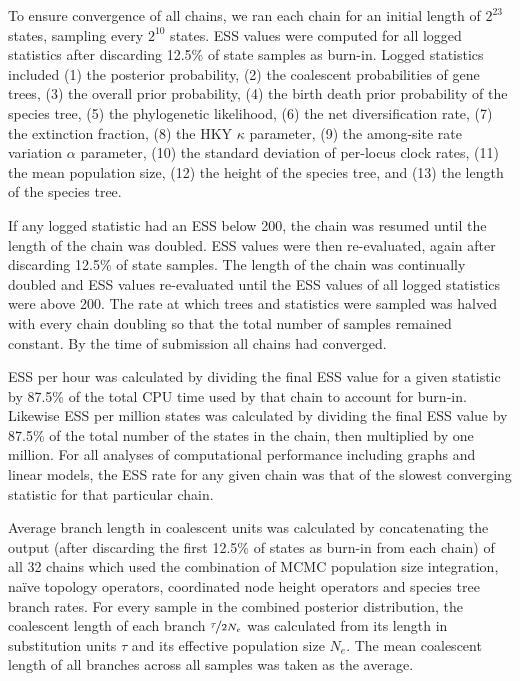 \documentclass[12pt]{article}
\begin{document}
To ensure convergence of all chains, we ran each chain for an initial length of
$2^{23}$ states, sampling every $2^{10}$ states. ESS values were computed for
all logged statistics after discarding 12.5\% of state samples as burn-in.
Logged statistics included (1) the posterior probability, (2) the coalescent
probabilities of gene trees, (3) the overall prior probability, (4) the birth
death prior probability of the species tree, (5) the phylogenetic likelihood,
(6) the net diversification rate, (7) the extinction fraction, (8) the HKY
$\kappa$ parameter, (9) the among-site rate variation $\alpha$ parameter, (10)
the standard deviation of per-locus clock rates, (11) the mean population size,
(12) the height of the species tree, and (13) the length of the species tree.

If any logged statistic had an ESS below 200, the chain was resumed until the
length of the chain was doubled. ESS values were then re-evaluated, again after
discarding 12.5\% of state samples. The length of the chain was continually
doubled and ESS values re-evaluated until the ESS values of all logged
statistics were above 200. The rate at which trees and statistics were sampled
was halved with every chain doubling so that the total number of samples
remained constant. By the time of submission all chains had converged.

ESS per hour was calculated by dividing the final ESS value for a given
statistic by 87.5\% of the total CPU time used by that chain to account for
burn-in. Likewise ESS per million states was calculated by dividing the final
ESS value by 87.5\% of the total number of the states in the chain, then
multiplied by one million. For all analyses of computational performance
including graphs and linear models, the ESS rate for any given chain was that of
the slowest converging statistic for that particular chain.

Average branch length in coalescent units was calculated by concatenating the
output (after discarding the first 12.5\% of states as burn-in from each chain) of all 32 chains
which used the combination of MCMC population size integration, na\"ive topology
operators, coordinated node height operators and species tree branch rates. For
every sample in the combined posterior distribution, the coalescent length of
each branch $\nicefrac{\tau}{2N_e}$ was calculated from its length in
substitution units $\tau$ and its effective population size $N_e$. The mean
coalescent length of all branches across all samples was taken as the average.
\end{document}
